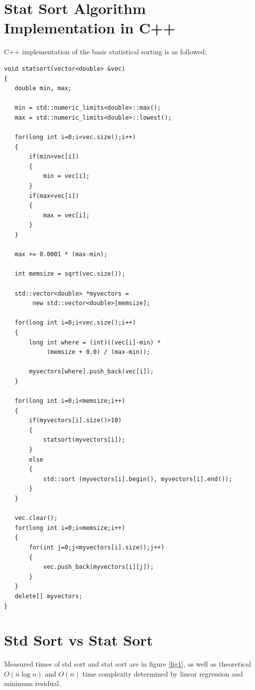 \documentclass[12pt]{article}
\begin{document}
		
	\section{Stat Sort Algorithm Implementation in C++}
	
	C++ implementation of the basic statistical sorting is as followed:
	
		\begin{lstlisting}
void statsort(vector<double> &vec)
{
   double min, max;

   min = std::numeric_limits<double>::max();
   max = std::numeric_limits<double>::lowest();

   for(long int i=0;i<vec.size();i++)
   {
       if(min>vec[i])
       {
           min = vec[i];
       }
       if(max<vec[i])
       {
           max = vec[i];
       }
   }

   max += 0.0001 * (max-min);

   int memsize = sqrt(vec.size());

   std::vector<double> *myvectors =
   		new std::vector<double>[memsize];

   for(long int i=0;i<vec.size();i++)
   {
       long int where = (int)((vec[i]-min) *
       		(memsize + 0.0) / (max-min));

       myvectors[where].push_back(vec[i]);
   }

   for(long int i=0;i<memsize;i++)
   {
       if(myvectors[i].size()>10)
       {
           statsort(myvectors[i]);
       }
       else
       {
           std::sort (myvectors[i].begin(), myvectors[i].end());
       }
   }

   vec.clear();
   for(long int i=0;i<memsize;i++)
   {
       for(int j=0;j<myvectors[i].size();j++)
       {
           vec.push_back(myvectors[i][j]);
       }
   }
   delete[] myvectors;
}
		\end{lstlisting}
	
	\section{Std Sort vs Stat Sort}
	
		Measured times of std sort and stat sort are in figure \ref{fig1}, as well as theoretical $O(n \log n)$ and $O(n)$ time complexity determined by linear regression and minimum residual.
\end{document}
